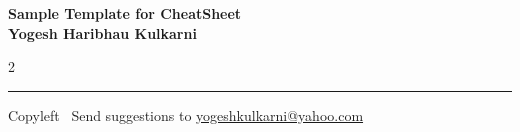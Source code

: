 \documentclass[8pt,landscape]{article}
\begin{document}
\footnotesize


\begin{center}
\Large{\textbf{Sample Template for CheatSheet\\ Yogesh Haribhau Kulkarni}}  
\end{center}

\begin{multicols}{2}

\end{multicols}

\rule{\linewidth}{0.25pt}
\scriptsize
Copyleft \textcopyleft\  Send suggestions to 
\href{http://www.yogeshkulkarni.com}{yogeshkulkarni@yahoo.com}
\end{document}
